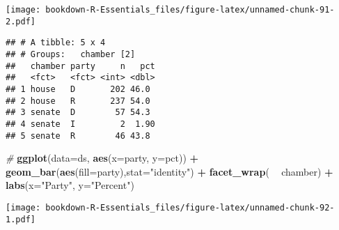 \documentclass[
]{book}
\newenvironment{Shaded}{\begin{snugshade}}{\end{snugshade}}
\newcommand{\CommentTok}[1]{\textcolor[rgb]{0.56,0.35,0.01}{\textit{#1}}}
\newcommand{\DataTypeTok}[1]{\textcolor[rgb]{0.13,0.29,0.53}{#1}}
\newcommand{\DecValTok}[1]{\textcolor[rgb]{0.00,0.00,0.81}{#1}}
\newcommand{\KeywordTok}[1]{\textcolor[rgb]{0.13,0.29,0.53}{\textbf{#1}}}
\newcommand{\NormalTok}[1]{#1}
\newcommand{\OperatorTok}[1]{\textcolor[rgb]{0.81,0.36,0.00}{\textbf{#1}}}
\newcommand{\StringTok}[1]{\textcolor[rgb]{0.31,0.60,0.02}{#1}}
\begin{document}
\texttt{[image: bookdown-R-Essentials\_files/figure-latex/unnamed-chunk-91-2.pdf]}

\begin{Shaded}
\end{Shaded}

\begin{verbatim}
## # A tibble: 5 x 4
## # Groups:   chamber [2]
##   chamber party     n   pct
##   <fct>   <fct> <int> <dbl>
## 1 house   D       202 46.0 
## 2 house   R       237 54.0 
## 3 senate  D        57 54.3 
## 4 senate  I         2  1.90
## 5 senate  R        46 43.8
\end{verbatim}

\begin{Shaded}
\begin{Highlighting}[]
\CommentTok{#}
\KeywordTok{ggplot}\NormalTok{(}\DataTypeTok{data=}\NormalTok{ds, }\KeywordTok{aes}\NormalTok{(}\DataTypeTok{x=}\NormalTok{party, }\DataTypeTok{y=}\NormalTok{pct)) }\OperatorTok{+}\StringTok{ }\KeywordTok{geom_bar}\NormalTok{(}\KeywordTok{aes}\NormalTok{(}\DataTypeTok{fill=}\NormalTok{party),}\DataTypeTok{stat=}\StringTok{"identity"}\NormalTok{) }\OperatorTok{+}
\StringTok{  }\KeywordTok{facet_wrap}\NormalTok{( }\OperatorTok{~}\StringTok{ }\NormalTok{chamber) }\OperatorTok{+}
\StringTok{  }\KeywordTok{labs}\NormalTok{(}\DataTypeTok{x=}\StringTok{"Party"}\NormalTok{, }\DataTypeTok{y=}\StringTok{"Percent"}\NormalTok{)}
\end{Highlighting}
\end{Shaded}

\texttt{[image: bookdown-R-Essentials\_files/figure-latex/unnamed-chunk-92-1.pdf]}
\end{document}
